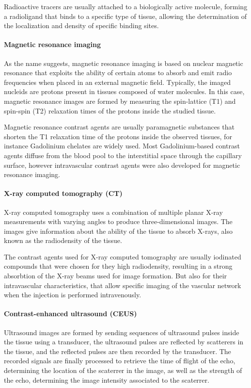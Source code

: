 Radioactive tracers are usually attached to a biologically active molecule, forming a radioligand that binds to a specific type of tissue, allowing the determination of the localization and density of specific binding sites.

\paragraph{Magnetic resonance imaging}
\label{sec:IntroMR}
As the name suggests, magnetic resonance imaging is based on nuclear magnetic resonance that exploits the ability of certain atoms to absorb and emit radio frequencies when placed in an external magnetic field.
Typically, the imaged nucleids are protons present in tissues composed of water molecules.
In this case, magnetic resonance images are formed by measuring the spin-lattice (T1) and spin-spin (T2) relaxation times of the protons inside the studied tissue.

Magnetic resonance contrast agents are usually paramagnetic substances that shorten the T1 relaxation time of the protons inside the observed tissues, for instance Gadolinium chelates are widely used.
Most Gadolinium-based contrast agents diffuse from the blood pool to the interstitial space through the capillary surface, however intravascular contrast agents were also developed for magnetic resonance imaging.

\paragraph{X-ray computed tomography (CT)}
\label{sec:IntroCT}
X-ray computed tomography uses a combination of multiple planar X-ray measurements with varying angles to produce three-dimensional images.
The images give information about the ability of the tissue to absorb X-rays, also known as the radiodensity of the tissue. 

The contrast agents used for X-ray computed tomography are usually iodinated compounds that were chosen for they high radiodensity, resulting in a strong absorbtion of the X-ray beams used for image formation.
But also for their intravascular characteristics, that allow specific imaging of the vascular network when the injection is performed intravenously.

\paragraph{Contrast-enhanced ultrasound (CEUS)}
\label{sec:IntroCEUS}
Ultrasound images are formed by sending sequences of ultrasound pulses inside the tissue using a transducer, the ultrasound pulses are reflected by scatterers in the tissue, and the reflected pulses are then recorded by the transducer.
The recorded signals are finally processed to retrieve the time of flight of the echo, determining the location of the scaterrer in the image, as well as the strength of the echo, determining the image intensity associated to the scaterrer.

